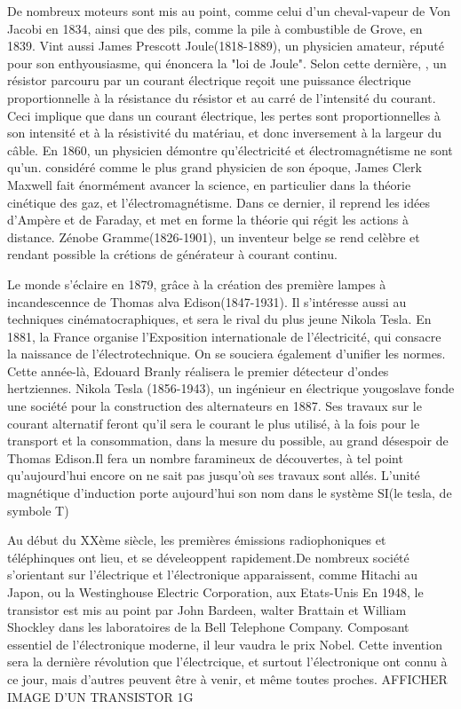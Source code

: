 \documentclass[12pt]{report}
\begin{document}
    De nombreux moteurs sont mis au point, comme celui d'un cheval-vapeur de Von Jacobi en 1834, ainsi que des pils, comme la pile à combustible de Grove, en 1839.
Vint aussi James Prescott Joule(1818-1889), un physicien amateur, réputé pour son enthyousiasme, qui énoncera la "loi de Joule". Selon cette dernière, , un résistor parcouru par un courant électrique reçoit une puissance électrique proportionnelle à la résistance du résistor et au carré de l'intensité du courant. Ceci implique que dans un courant électrique, les pertes sont proportionnelles à son intensité et à la résistivité du matériau, et donc inversement à la largeur du câble.
En 1860, un physicien démontre qu'électricité et électromagnétisme ne sont qu'un. considéré comme le plus grand physicien de son époque, James Clerk Maxwell fait énormément avancer la science, en particulier dans la théorie cinétique des gaz, et l'électromagnétisme. Dans ce dernier, il reprend les idées d'Ampère et de Faraday, et met en forme la théorie qui régit les actions à distance.
Zénobe Gramme(1826-1901), un inventeur belge se rend celèbre et rendant possible la crétions de générateur à courant continu.

    Le monde s'éclaire en 1879, grâce à la création des première lampes à incandescennce de Thomas alva Edison(1847-1931). Il s'intéresse aussi au techniques cinématocraphiques, et sera le rival du plus jeune Nikola Tesla.
En 1881, la France organise l'Exposition internationale de l'électricité, qui consacre la naissance de l'électrotechnique. On se souciera également d'unifier les normes. Cette année-là, Edouard Branly réalisera le premier détecteur d'ondes hertziennes.
Nikola Tesla (1856-1943), un ingénieur en électrique yougoslave fonde une société pour la construction des alternateurs en 1887. Ses travaux sur le courant alternatif feront qu'il sera le courant le plus utilisé, à la fois pour le transport et la consommation, dans la mesure du possible, au grand désespoir de Thomas Edison.Il fera un nombre faramineux de découvertes, à tel point qu'aujourd'hui encore on ne sait pas jusqu'où ses travaux sont allés. L'unité magnétique d'induction porte aujourd'hui son nom dans le système SI(le tesla, de symbole T)
    
    Au début du XXème siècle, les premières émissions radiophoniques et téléphinques ont lieu, et se déveleoppent rapidement.De nombreux société s'orientant sur l'électrique et l'électronique apparaissent, comme Hitachi au Japon, ou la Westinghouse Electric Corporation, aux Etats-Unis
En 1948, le transistor est mis au point par John Bardeen, walter Brattain et William Shockley dans les laboratoires de la Bell Telephone Company. Composant essentiel de l'électronique moderne, il leur vaudra le prix Nobel.
Cette invention sera la dernière révolution que l'électrcique, et surtout l'électronique ont connu à ce jour, mais d'autres peuvent être à venir, et même toutes proches.
AFFICHER IMAGE D'UN TRANSISTOR 1G
\end{document}
